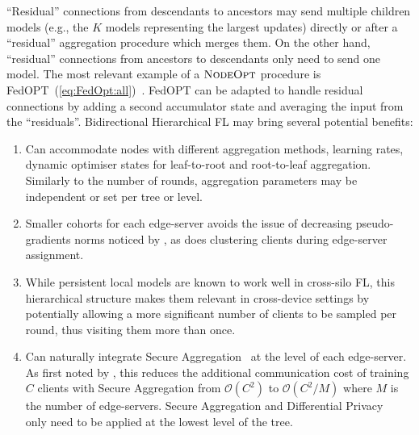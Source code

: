 ``Residual'' connections from descendants to ancestors may send multiple children models (e.g., the $K$ models representing the largest updates) directly or after a ``residual'' aggregation procedure which merges them. On the other hand, ``residual'' connections from ancestors to descendants only need to send one model. The most relevant example of a $\textsc{NodeOpt}$ procedure is FedOPT~(\cref{eq:FedOpt:all})~\citep{FedOPT}. FedOPT can be adapted to handle residual connections by adding a second accumulator state and averaging the input from the ``residuals''.
Bidirectional Hierarchical FL  may bring several potential benefits:
\begin{enumerate}
    \item Can accommodate nodes with different aggregation methods, learning rates, dynamic optimiser states for leaf-to-root and root-to-leaf aggregation. Similarly to the number of rounds, aggregation parameters may be independent or set per tree or level.
    \item Smaller cohorts for each edge-server avoids the issue of decreasing pseudo-gradients norms noticed by \citet{LargeCohorts}, as does clustering clients during edge-server assignment.
    \item While persistent local models are known to work well in cross-silo FL, this hierarchical structure makes them relevant in cross-device settings by potentially allowing a more significant number of clients to be sampled per round, thus visiting them more than once.
    \item Can naturally integrate Secure Aggregation~\citep{SecAggOG,FastSecAgg} at the level of each edge-server. As first noted by \citet{ScaleSystemDesign}, this reduces the additional communication cost of training $C$ clients with Secure Aggregation from $\mathcal{O}(C^2)$ to $\mathcal{O}(C^2/M)$ where $M$ is the number of edge-servers. Secure Aggregation and Differential Privacy~\citep{DiffPrivacyFL} only need to be applied at the lowest level of the tree.

\end{enumerate}


